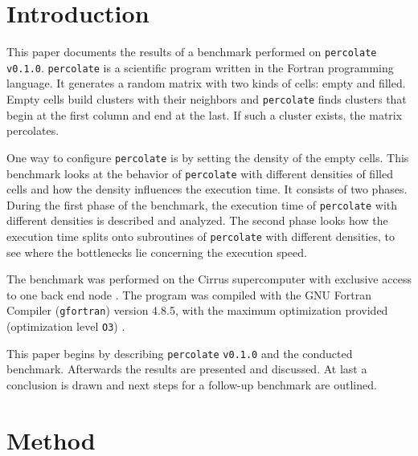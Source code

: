 \documentclass[twoside,11pt]{article}
\title{\titl}
\author{}
\def\perc{\texttt{perco\-late}}
\def\v{\texttt{v0.1.0}}
\begin{document}
\maketitle

\begin{abstract}
\end{abstract}

\begin{keywords}
\end{keywords}

\section{Introduction} %

This paper documents the results of a benchmark performed
on \perc{} \v{}.
\perc{} is a scientific program written in the
Fortran programming language. It generates a random matrix
with two kinds of cells: empty and filled.
Empty cells build clusters with their neighbors and
\perc{} finds clusters that begin at the first column and
end at the last.
If such a cluster exists, the matrix percolates.

One way to configure \perc{} is by setting the density of
the empty cells.
This benchmark looks at the behavior of \perc{} with
different densities of filled cells and how the density
influences the execution time.
It consists of two phases.
During the first phase of the benchmark, the execution time
of \perc{} with different densities is described and
analyzed.
The second phase looks how the execution time splits onto
subroutines of \perc{} with different densities, to see
where the bottlenecks lie concerning the execution speed.

The benchmark was performed on the Cirrus supercomputer
with exclusive access to one back end node
\citep[see][]{cirrus}.
The program was compiled with the GNU Fortran Compiler
(\texttt{gfortran}) version 4.8.5, with the maximum
optimization provided (optimization level \texttt{O3})
\citep[see][]{gfortran}.

This paper begins by describing \perc{} \v{} and the
conducted benchmark.
Afterwards the results are presented and discussed.
At last a conclusion is drawn and next steps for a
follow-up benchmark are outlined.

\section{Method} %
\end{document}
